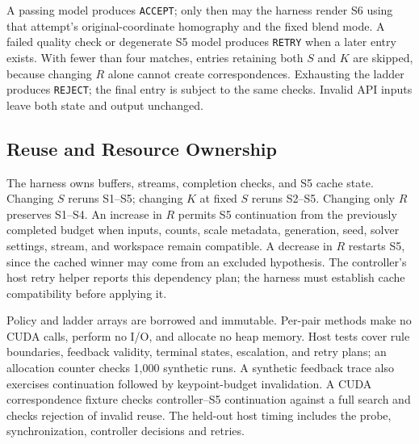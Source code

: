 A passing model produces \texttt{ACCEPT}; only then may the harness render S6
using that attempt's original-coordinate homography and the fixed blend mode.
A failed quality check or degenerate S5 model produces \texttt{RETRY} when a
later entry exists. With fewer than four matches, entries retaining both $S$
and $K$ are skipped, because changing $R$ alone cannot create correspondences.
Exhausting the ladder produces \texttt{REJECT}; the final entry is subject to
the same checks. Invalid API inputs leave both state and output unchanged.

\subsection{Reuse and Resource Ownership}
The harness owns buffers, streams, completion checks, and S5 cache state.
Changing $S$ reruns S1--S5; changing $K$ at fixed $S$ reruns S2--S5. Changing
only $R$ preserves S1--S4. An increase in $R$ permits S5 continuation from the
previously completed budget when inputs, counts, scale metadata, generation,
seed, solver settings, stream, and workspace remain compatible. A decrease in
$R$ restarts S5, since the cached winner may come from an excluded hypothesis.
The controller's host retry helper reports this dependency plan; the harness
must establish cache compatibility before applying it.

Policy and ladder arrays are borrowed and immutable. Per-pair methods make no
CUDA calls, perform no I/O, and allocate no heap memory. Host tests cover rule
boundaries, feedback validity, terminal states, escalation, and retry plans;
an allocation counter checks 1,000 synthetic runs. A synthetic feedback trace
also exercises continuation followed by keypoint-budget invalidation. A CUDA
correspondence fixture checks controller--S5 continuation against a full search
and checks rejection of invalid reuse. The held-out host timing includes the
probe, synchronization, controller decisions and retries.
